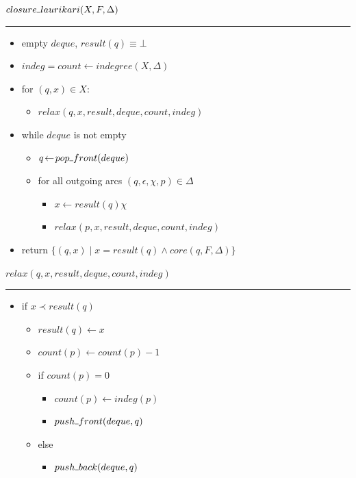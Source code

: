 \documentclass{article}
\newcommand{\Xset}{\!\leftarrow\!}
\newcommand{\Xund}{\rule{.4em}{.4pt}} %
\newcommand{\Xin}{\!\in\!}
\newcommand{\Xeq}{\!=\!}
\theoremstyle{definition}
\begin{document}
\begin{multicols}{2}
    $closure \Xund laurikari(X, F, \Delta)$
    \hrule
    \begin{itemize}[leftmargin=0in]
        \smallskip
        \item[] empty $deque$, $result(q) \equiv \bot$
        \item[] $indeg \Xeq count \Xset indegree(X, \Delta)$
        \item[] for $(q, x) \Xin X$:
        \begin{itemize}
            \item[] $relax(q, x, result, deque, count, indeg)$
        \end{itemize}
        \item[] while $deque$ is not empty
        \begin{itemize}
            \item[] $q \Xset pop \Xund front (deque)$
            \item[] for all outgoing arcs $(q, \epsilon, \chi, p) \Xin \Delta$
            \begin{itemize}
                \item[] $x \Xset result(q) \chi$
                \item[] $relax(p, x, result, deque, count, indeg)$
            \end{itemize}
        \end{itemize}
        \item[] return $\{ (q, x) \mid x \Xeq result(q) \wedge core(q, F, \Delta) \}$
    \end{itemize}

    \bigskip

    $relax(q, x, result, deque, count, indeg)$
    \hrule
    \begin{itemize}[leftmargin=0in]
        \smallskip
        \item[] if $x \prec result(q)$
        \begin{itemize}
            \item[] $result(q) \Xset x$
            \item[] $count(p) \Xset count(p) - 1$
            \item[] if $count(p) \Xeq 0$
            \begin{itemize}
                \item[] $count(p) \Xset indeg(p)$
                \item[] $push \Xund front (deque, q)$
            \end{itemize}
            \item[] else
            \begin{itemize}
                \item[] $push \Xund back (deque, q)$
            \end{itemize}
        \end{itemize}
    \end{itemize}


\end{multicols}
\end{document}
